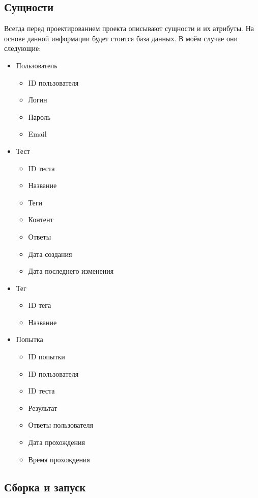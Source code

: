 \subsection{Сущности}
Всегда перед проектированием проекта описывают сущности и их атрибуты. На основе данной информации будет стоится база данных. В моём случае они следующие:

\begin{itemize}
    \item Пользователь
    \begin{itemize}
        \item ID пользователя
        \item Логин
        \item Пароль
        \item Email
    \end{itemize}
    \item Тест
    \begin{itemize}
        \item ID теста
        \item Название
        \item Теги
        \item Контент
        \item Ответы
        \item Дата создания
        \item Дата последнего изменения
    \end{itemize}
    \item Тег
    \begin{itemize}
        \item ID тега
        \item Название
    \end{itemize}
    \item Попытка
    \begin{itemize}
        \item ID попытки
        \item ID пользователя
        \item ID теста
        \item Результат
        \item Ответы пользователя
        \item Дата прохождения
        \item Время прохождения
    \end{itemize}
\end{itemize}

\subsection{Сборка и запуск}
